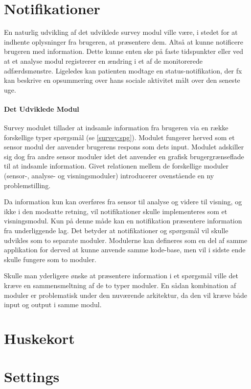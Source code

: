 \section{Notifikationer}
En naturlig udvikling af det udviklede survey modul ville være, i stedet for at indhente oplysninger fra brugeren, at præsentere dem.
Altså at kunne notificere brugeren med information.
Dette kunne enten ske på faste tidspunkter eller ved at et analyse modul registrerer en ændring i et af de monitorerede adfærdsmønstre.
Ligeledes kan patienten modtage en status-notifikation, der fx kan beskrive en opsummering over hans sociale aktivitet målt over den seneste uge.

\paragraph{Det Udviklede Modul}
Survey modulet tillader at indsamle information fra brugeren via en række forskellige typer spørgsmål (se \cref{survey:spg}).
Modulet fungerer herved som et sensor modul der anvender brugerens respons som dets input.
Modulet adskiller sig dog fra andre sensor moduler idet det anvender en grafisk brugergrænseflade til at indsamle information.
Givet relationen mellem de forskellige moduler (sensor-, analyse- og visningsmoduler) introducerer ovenstående en ny problemstilling.

Da information kun kan overføres fra sensor til analyse og videre til visning, og ikke i den modsatte retning, vil notifikationer skulle implementeres som et visningsmodul.
Kun på denne måde kan en notifikation præsentere information fra underliggende lag.
Det betyder at notifikationer og spørgsmål vil skulle udvikles som to separate moduler.
Modulerne kan defineres som en del af samme applikation for derved at kunne anvende samme kode-base, men vil i sidste ende skulle fungere som to moduler.

Skulle man yderligere ønske at præsentere information i et spørgsmål ville det kræve en sammensmeltning af de to typer moduler.
En sådan kombination af moduler er problematisk under den nuværende arkitektur, da den vil kræve både input og output i samme modul.

\section{Huskekort}

\section{Settings}
